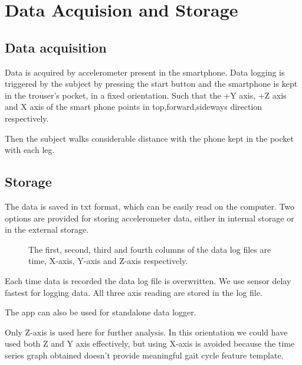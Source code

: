 \chapter{Data Acquision and Storage}\label{final}


\section{Data acquisition}
Data is acquired by accelerometer present in the smartphone. Data logging is triggered by the subject by pressing the start button and the smartphone is kept in the trouser’s pocket, in a fixed orientation. Such that the +Y axis, +Z axis and X axis of the smart phone points in top,forward,sideways direction respectively.\newline

Then the subject walks considerable distance with the phone kept in the pocket with each leg.
\section{Storage}

The data is saved in txt format, which can be easily read on the computer. Two options are provided for storing accelerometer data, either in internal storage or in the external storage.\newline

\begin{figure}
\caption{The first, second, third and  fourth columns of the data log files are time, X-axis, Y-axis and  Z-axis respectively.}
\end{figure}

Each time data is recorded the data log file is overwritten.
We use sensor delay fastest for logging data. All three axis reading are stored in the log file.\newline

The app can also be used for standalone data logger.\newline

Only Z-axis is used here for further analysis. In this orientation we could have used both Z and Y axis effectively, but using X-axis is avoided because the time series graph obtained doesn’t provide meaningful gait cycle feature template.\\

